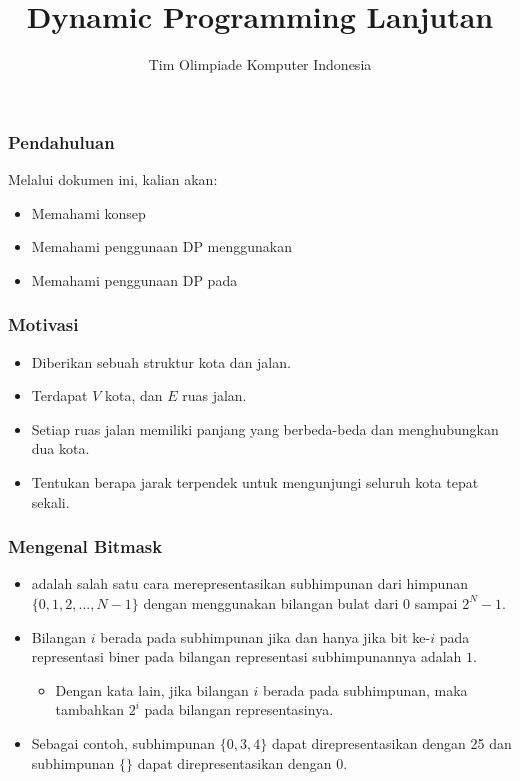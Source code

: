 

\title{Dynamic Programming Lanjutan}
\author{Tim Olimpiade Komputer Indonesia}
\date{}



\begin{frame}
\titlepage
\end{frame}

\begin{frame}
\frametitle{Pendahuluan}
Melalui dokumen ini, kalian akan:
\begin{itemize}
  \item Memahami konsep \fbitmask
  \item Memahami penggunaan DP menggunakan \fbitmask
  \item Memahami penggunaan DP pada \ftree
\end{itemize}
\end{frame}

\begin{frame}
\frametitle{Motivasi}
\begin{itemize}
  \item Diberikan sebuah struktur kota dan jalan.
  \item Terdapat $V$ kota, dan $E$ ruas jalan.
  \item Setiap ruas jalan memiliki panjang yang berbeda-beda dan menghubungkan dua kota.
  \item Tentukan berapa jarak terpendek untuk mengunjungi seluruh kota tepat sekali.
\end{itemize}
\end{frame}

\begin{frame}
\frametitle{Mengenal Bitmask}
\begin{itemize}
  \item {} adalah salah satu cara merepresentasikan subhimpunan dari himpunan $\{0, 1, 2, ..., N - 1\}$ dengan menggunakan bilangan bulat dari $0$ sampai $2^N - 1$.
  \item Bilangan $i$ berada pada subhimpunan jika dan hanya jika bit ke-$i$ pada representasi biner pada bilangan representasi subhimpunannya adalah $1$.
  \begin{itemize}
    \item Dengan kata lain, jika bilangan $i$ berada pada subhimpunan, maka tambahkan $2^i$ pada bilangan representasinya.
  \end{itemize}
  \item Sebagai contoh, subhimpunan $\{0, 3, 4\}$ dapat direpresentasikan dengan 25 dan subhimpunan $\{\}$ dapat direpresentasikan dengan $0$.
\end{itemize}
\end{frame}

